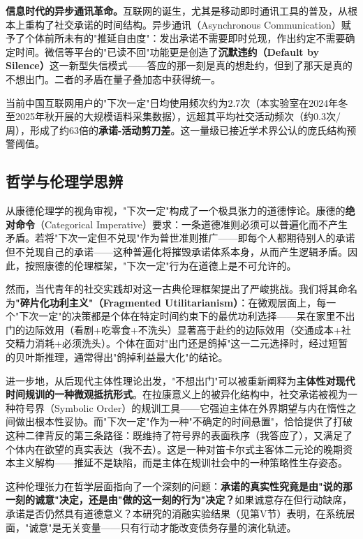 \documentclass[journal]{IEEEtran}
\begin{document}
\textbf{信息时代的异步通讯革命。}互联网的诞生，尤其是移动即时通讯工具的普及，从根本上重构了社交承诺的时间结构。异步通讯（Asynchronous Communication）赋予了个体前所未有的"推延自由度"：发出承诺不需要即时兑现，作出约定不需要确定时间。微信等平台的"已读不回"功能更是创造了\textbf{沉默违约（Default by Silence）}这一新型失信模式——答应的那一刻是真的想赴约，但到了那天是真的不想出门。二者的矛盾在量子叠加态中获得统一。

当前中国互联网用户的"下次一定"日均使用频次约为2.7次（本实验室在2024年冬至2025年秋开展的大规模语料采集数据），远超其平均社交活动频次（约0.3次/周），形成了约63倍的\textbf{承诺-活动剪刀差}。这一量级已接近学术界公认的庞氏结构预警阈值。

\subsection{哲学与伦理学思辨}

从康德伦理学的视角审视，"下次一定"构成了一个极具张力的道德悖论。康德的\textbf{绝对命令}（Categorical Imperative）要求：一条道德准则必须可以普遍化而不产生矛盾。若将"下次一定但不兑现"作为普世准则推广——即每个人都期待别人的承诺但不兑现自己的承诺——这种普遍化将摧毁承诺体系本身，从而产生逻辑矛盾。因此，按照康德的伦理框架，"下次一定"行为在道德上是不可允许的。

然而，当代青年的社交实践却对这一古典伦理框架提出了严峻挑战。我们将其命名为\textbf{"碎片化功利主义"（Fragmented Utilitarianism）}：在微观层面上，每一个"下次一定"的决策都是个体在特定时间约束下的最优功利选择——呆在家里不出门的边际效用（看剧+吃零食+不洗头）显著高于赴约的边际效用（交通成本+社交精力消耗+必须洗头）。个体在面对"出门还是鸽掉"这一二元选择时，经过短暂的贝叶斯推理，通常得出"鸽掉利益最大化"的结论。

进一步地，从后现代主体性理论出发，"不想出门"可以被重新阐释为\textbf{主体性对现代时间规训的一种微观抵抗形式}。在拉康意义上的被异化结构中，社交承诺被视为一种符号界（Symbolic Order）的规训工具——它强迫主体在外界期望与内在惰性之间做出根本性妥协。而"下次一定"作为一种"不确定的时间悬置"，恰恰提供了打破这种二律背反的第三条路径：既维持了符号界的表面秩序（我答应了），又满足了个体内在欲望的真实表达（我不去）。这是一种对笛卡尔式主客体二元论的晚期资本主义解构——推延不是缺陷，而是主体在规训社会中的一种策略性生存姿态。

这种伦理张力在哲学层面指向了一个深刻的问题：\textbf{承诺的真实性究竟是由"说的那一刻的诚意"决定，还是由"做的这一刻的行为"决定？}如果诚意存在但行动缺席，承诺是否仍然具有道德意义？本研究的消融实验结果（见第V节）表明，在系统层面，"诚意"是无关变量——只有行动才能改变债务存量的演化轨迹。
\end{document}

